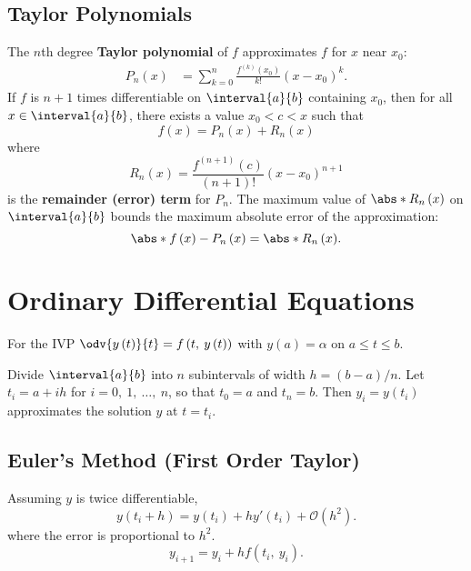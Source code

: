 \documentclass{article}
\begin{document}
\begin{multicols}{3}
    \subsection{Taylor Polynomials}
    The \(n\)th degree \textbf{Taylor polynomial} of \(f\)
    approximates \(f\) for \(x\) near \(x_0\):
    \begin{align*}
        P_n\left( x \right) & = \sum_{k = 0}^n \frac{f^{\left( k \right)}\left( x_0 \right)}{k!} \left( x - x_0 \right)^k.
    \end{align*}
    If \(f\) is \(n + 1\) times differentiable on \(\interval{a}{b}\) containing \(x_0\),
    then for all \(x \in \interval{a}{b}\),
    there exists a value \(x_0 < c < x\) such that
    \begin{equation*}
        f\left( x \right) = P_n\left( x \right) + R_n\left( x \right)
    \end{equation*}
    where
    \begin{equation*}
        R_n\left( x \right) = \frac{f^{\left( n + 1 \right)}\left( c \right)}{\left( n + 1 \right)!} \left( x - x_0 \right)^{n + 1}
    \end{equation*}
    is the \textbf{remainder (error) term} for \(P_n\).
    The maximum value of \(\abs*{R_n\left( x \right)}\) on \(\interval{a}{b}\) bounds the maximum absolute error of the approximation:
    \begin{equation*}
        \abs*{f\left( x \right) - P_n\left( x \right)} = \abs*{R_n\left( x \right)}.
    \end{equation*}
    \section{Ordinary Differential Equations}
    For the IVP \(\odv{y\left( t \right)}{t} = f\left( t,\: y\left( t \right) \right)\) with \(y\left( a \right) = \alpha\) on \(a \leq t \leq b\).

    Divide \(\interval{a}{b}\) into \(n\) subintervals of width \(h = \left( b - a \right) / n\).
    Let \(t_i = a + i h\) for \(i = 0,\: 1,\: \ldots,\: n\), so that \(t_0 = a\) and \(t_n = b\).
    Then \(y_i = y\left( t_i \right)\) approximates the solution \(y\) at \(t = t_i\).
    \subsection{Euler's Method (First Order Taylor)}
    Assuming \(y\) is twice differentiable,
    \begin{equation*}
        y\left( t_i + h \right) = y\left( t_i \right) + h y'\left( t_i \right) + \mathcal{O}\left( h^2 \right).
    \end{equation*}
    where the error is proportional to \(h^2\).
    \begin{equation*}
        y_{i + 1} = y_i + h f\left( t_i,\: y_i \right).
    \end{equation*}

\end{multicols}
\end{document}
